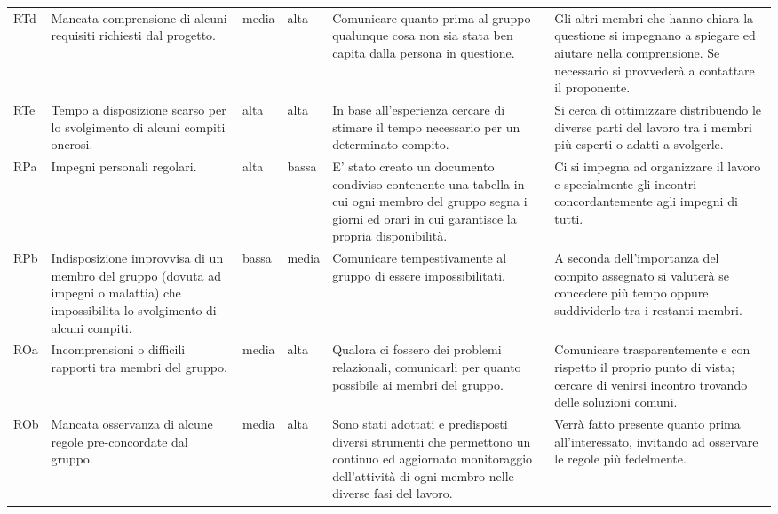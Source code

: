 {\begin{longtable}{|p{1cm}|p{3cm}|p{1cm}|p{1cm}|p{3cm}|p{3cm}|}
        RTd &
        Mancata comprensione di alcuni requisiti richiesti dal progetto. &
        media &
        alta &
        Comunicare quanto prima al gruppo qualunque cosa non sia stata ben capita dalla persona in questione. &
        Gli altri membri che hanno chiara la questione si impegnano a spiegare ed aiutare nella comprensione. Se necessario si provvederà a contattare il proponente. \\

        RTe &
        Tempo a disposizione scarso per lo svolgimento di alcuni compiti onerosi. &
        alta &
        alta &
        In base all'esperienza cercare di stimare il tempo necessario per un determinato compito. &
        Si cerca di ottimizzare distribuendo le diverse parti del lavoro tra i membri più esperti o adatti a svolgerle. \\

        RPa &
        Impegni personali regolari. &
        alta &
        bassa &
        E' stato creato un documento condiviso contenente una tabella in cui ogni membro del gruppo segna i giorni ed orari in cui garantisce la propria disponibilità. &
        Ci si impegna ad organizzare il lavoro e specialmente gli incontri concordantemente agli impegni di tutti. \\

        RPb &
        Indisposizione improvvisa di un membro del gruppo (dovuta ad impegni o malattia) che impossibilita lo svolgimento di alcuni compiti. &
        bassa &
        media &
        Comunicare tempestivamente al gruppo di essere impossibilitati. &
        A seconda dell'importanza del compito assegnato si valuterà se concedere più tempo oppure suddividerlo tra i restanti membri. \\

        ROa &
        Incomprensioni o difficili rapporti tra membri del gruppo. &
        media &
        alta &
        Qualora ci fossero dei problemi relazionali, comunicarli per quanto possibile ai membri del gruppo. &
        Comunicare trasparentemente e con rispetto il proprio punto di vista; cercare di venirsi incontro trovando delle soluzioni comuni. \\

        ROb &
        Mancata osservanza di alcune regole pre-concordate dal gruppo. &
        media &
        alta &
        Sono stati adottati e predisposti diversi strumenti che permettono un continuo ed aggiornato monitoraggio dell'attività di ogni membro nelle diverse fasi del lavoro. &
        Verrà fatto presente quanto prima all'interessato, invitando ad osservare le regole più fedelmente. \\


\end{longtable}}
